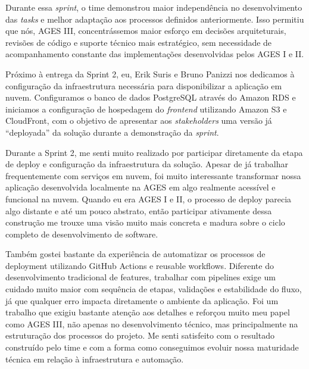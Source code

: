 \indent Durante essa \textit{sprint}, o time demonstrou maior independência no desenvolvimento das \textit{tasks} e melhor adaptação aos processos definidos anteriormente. Isso permitiu que nós, AGES III, concentrássemos maior esforço em decisões arquiteturais, revisões de código e suporte técnico mais estratégico, sem necessidade de acompanhamento constante das implementações desenvolvidas pelos AGES I e II.\par

\indent Próximo à entrega da Sprint 2, eu, Erik Suris e Bruno Panizzi nos dedicamos à configuração da infraestrutura necessária para disponibilizar a aplicação em nuvem. Configuramos o banco de dados PostgreSQL através do Amazon RDS e iniciamos a configuração de hospedagem do \textit{frontend} utilizando Amazon S3 e CloudFront, com o objetivo de apresentar aos \textit{stakeholders} uma versão já “deployada” da solução durante a demonstração da \textit{sprint}.\par

\begin{reflection}
\indent \originaltab{}Durante a Sprint 2, me senti muito realizado por participar diretamente da etapa de deploy e configuração da infraestrutura da solução. Apesar de já trabalhar frequentemente com serviços em nuvem, foi muito interessante transformar nossa aplicação desenvolvida localmente na AGES em algo realmente acessível e funcional na nuvem. Quando eu era AGES I e II, o processo de deploy parecia algo distante e até um pouco abstrato, então participar ativamente dessa construção me trouxe uma visão muito mais concreta e madura sobre o ciclo completo de desenvolvimento de software.\par

\indent \originaltab{}Também gostei bastante da experiência de automatizar os processos de deployment utilizando GitHub Actions e reusable workflows. Diferente do desenvolvimento tradicional de features, trabalhar com pipelines exige um cuidado muito maior com sequência de etapas, validações e estabilidade do fluxo, já que qualquer erro impacta diretamente o ambiente da aplicação. Foi um trabalho que exigiu bastante atenção aos detalhes e reforçou muito meu papel como AGES III, não apenas no desenvolvimento técnico, mas principalmente na estruturação dos processos do projeto. Me senti satisfeito com o resultado construído pelo time e com a forma como conseguimos evoluir nossa maturidade técnica em relação à infraestrutura e automação.\par

\end{reflection}
